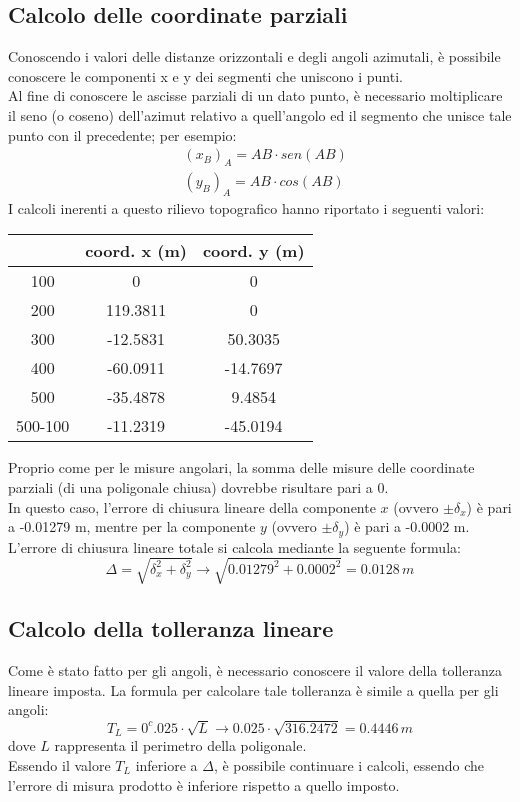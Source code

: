 \subsection{Calcolo delle coordinate parziali}
Conoscendo i valori delle distanze orizzontali e degli angoli azimutali, è possibile conoscere le componenti x e y dei segmenti che uniscono i punti.\\
Al fine di conoscere le ascisse parziali di un dato punto, è necessario moltiplicare il seno (o coseno) dell'azimut relativo a quell'angolo ed il segmento che unisce tale punto con il precedente; per esempio:
\begin{equation} \begin{split}
   & (x_B)_A = AB \cdot sen(AB) \\
   & (y_B)_A = AB \cdot cos(AB)
\end{split}
\end{equation}
I calcoli inerenti a questo rilievo topografico hanno riportato i seguenti valori:
\begin{table}[H] \centering
\begin{tabular}{ccc}
\toprule
 & coord. x (m)       & coord. y (m)       \\
\midrule
100 & 0  & 0                \\
200 & 119.3811 & 0          \\
300 & -12.5831 & 50.3035    \\
400 & -60.0911 & -14.7697   \\
500 & -35.4878 & 9.4854     \\
500-100 & -11.2319 & -45.0194  \\
\bottomrule
\end{tabular}
\end{table}
Proprio come per le misure angolari, la somma delle misure delle coordinate parziali (di una poligonale chiusa) dovrebbe risultare pari a 0.\\
In questo caso, l'errore di chiusura lineare della componente $x$ (ovvero $\pm\delta_x$) è pari a -0.01279 m, mentre per la componente $y$ (ovvero $\pm\delta_y$) è pari a -0.0002 m.\\
L'errore di chiusura lineare totale si calcola mediante la seguente formula:
\begin{equation}
    \Delta = \sqrt{\delta_x^2 + \delta_y^2 } \xrightarrow{} \sqrt{0.01279^2 + 0.0002^2} = 0.0128 \, m
\end{equation}
\subsection{Calcolo della tolleranza lineare}
Come è stato fatto per gli angoli, è necessario conoscere il valore della tolleranza lineare imposta.
La formula per calcolare tale tolleranza è simile a quella per gli angoli:
\begin{equation} \label{tolleranza_lineare}
    T_L = 0^c.025 \cdot\sqrt{L} \xrightarrow{} 0.025 \cdot \sqrt{316.2472} = 0.4446 \,m
\end{equation}
dove $L$ rappresenta il perimetro della poligonale.\\
Essendo il valore $T_L$ inferiore a $\Delta$, è possibile continuare i calcoli, essendo che l'errore di misura prodotto è inferiore rispetto a quello imposto.
